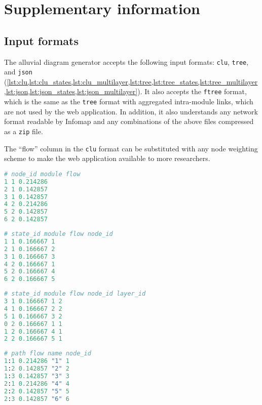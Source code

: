 \documentclass[aps,rmp,floats,floatfix,twocolumn,superscriptaddress,final]{revtex4-2}
\begin{document}
\section{Supplementary information}

\subsection{Input formats}
\label{sec:input}

The alluvial diagram generator accepts the following input formats: \texttt{clu}, \texttt{tree}, and \texttt{json} (\cref{lst:clu,lst:clu_states,lst:clu_multilayer,lst:tree,lst:tree_states,lst:tree_multilayer,lst:json,lst:json_states,lst:json_multilayer}). It also accepts the \texttt{ftree} format, which is the same as the \texttt{tree} format with aggregated intra-module links, which are not used by the web application. In addition, it also understands any network format readable by Infomap and any combinations of the above files compressed as a \texttt{zip} file.

The ``flow'' column in the \texttt{clu} format can be substituted with any node weighting scheme to make the web application available to more researchers.

\begin{lstlisting}[language=Python,label={lst:clu},caption=\texttt{clu} format]
# node_id module flow
1 1 0.214286
2 1 0.142857
3 1 0.142857
4 2 0.214286
5 2 0.142857
6 2 0.142857
\end{lstlisting}

\begin{lstlisting}[language=Python,label={lst:clu_states},caption=\texttt{clu} states format]
# state_id module flow node_id
1 1 0.166667 1
2 1 0.166667 2
3 1 0.166667 3
4 2 0.166667 1
5 2 0.166667 4
6 2 0.166667 5
\end{lstlisting}

\begin{lstlisting}[language=Python,label={lst:clu_multilayer},caption=\texttt{clu} multilayer format]
# state_id module flow node_id layer_id
3 1 0.166667 1 2
4 1 0.166667 2 2
5 1 0.166667 3 2
0 2 0.166667 1 1
1 2 0.166667 4 1
2 2 0.166667 5 1
\end{lstlisting}

\begin{lstlisting}[language=Python,label={lst:tree},caption=\texttt{tree} format]
# path flow name node_id
1:1 0.214286 "1" 1
1:2 0.142857 "2" 2
1:3 0.142857 "3" 3
2:1 0.214286 "4" 4
2:2 0.142857 "5" 5
2:3 0.142857 "6" 6
\end{lstlisting}
\end{document}
